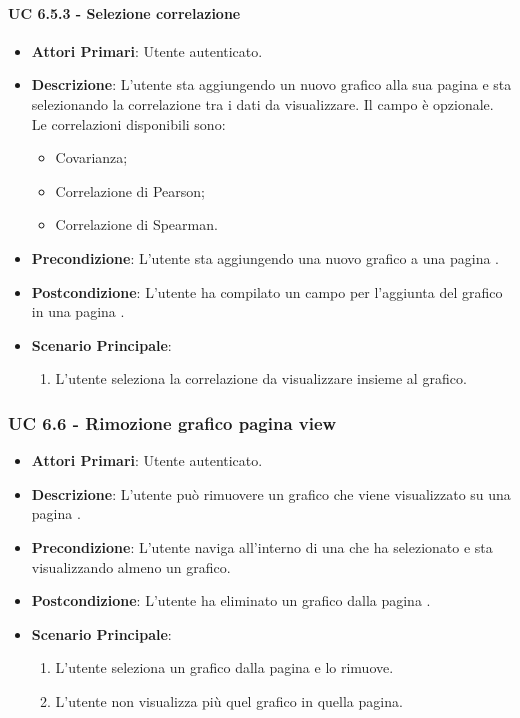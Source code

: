 			\paragraph{UC 6.5.3 - Selezione correlazione}
			\begin{itemize}
				\item \textbf{Attori Primari}: Utente autenticato.
				\item \textbf{Descrizione}: L'utente sta aggiungendo un nuovo grafico alla sua pagina  e sta selezionando la correlazione tra i dati da visualizzare. Il campo è opzionale. Le correlazioni disponibili sono:
				\begin{itemize}
					\item Covarianza;
					\item Correlazione di Pearson;
					\item Correlazione di Spearman.
				\end{itemize}
				\item \textbf{Precondizione}: L'utente sta aggiungendo una nuovo grafico a una pagina .
				\item \textbf{Postcondizione}: L'utente ha compilato un campo per l'aggiunta del grafico in una pagina .
				\item \textbf{Scenario Principale}:
				\begin{enumerate}
					\item{L'utente seleziona la correlazione da visualizzare insieme al grafico.}
				\end{enumerate}	
			\end{itemize}

			\subsubsection{UC 6.6 - Rimozione grafico pagina view}
			\begin{itemize}
				\item \textbf{Attori Primari}: Utente autenticato.
				\item \textbf{Descrizione}: L'utente può rimuovere un grafico che viene visualizzato su una pagina .
				\item \textbf{Precondizione}: L'utente naviga all'interno di una  che ha selezionato e sta visualizzando almeno un grafico.
				\item \textbf{Postcondizione}: L'utente ha eliminato un grafico dalla pagina  .
				\item \textbf{Scenario Principale}:
				\begin{enumerate}
					\item{L'utente seleziona un grafico dalla pagina  e lo rimuove.}
					\item{L'utente non visualizza più quel grafico in quella pagina.}
				\end{enumerate}	
			\end{itemize}